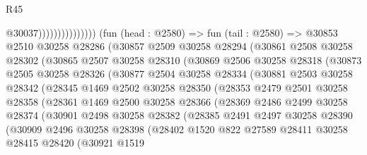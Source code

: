 \begin{lexlean}{R45}
\begin{coremodule}
                                      @30037)))))))))))))))
        (fun (head : @2580) =>
        fun (tail : @2580) =>
        @30853
          @2510
          @30258
          @28286
          (@30857
            @2509
            @30258
            @28294
            (@30861
              @2508
              @30258
              @28302
              (@30865
                @2507
                @30258
                @28310
                (@30869
                  @2506
                  @30258
                  @28318
                  (@30873
                    @2505
                    @30258
                    @28326
                    (@30877
                      @2504
                      @30258
                      @28334
                      (@30881
                        @2503
                        @30258
                        @28342
                        (@28345
                          @1469
                          @2502
                          @30258
                          @28350
                          (@28353
                            @2479
                            @2501
                            @30258
                            @28358
                            (@28361
                              @1469
                              @2500
                              @30258
                              @28366
                              (@28369
                                @2486
                                @2499
                                @30258
                                @28374
                                (@30901
                                  @2498
                                  @30258
                                  @28382
                                  (@28385
                                    @2491
                                    @2497
                                    @30258
                                    @28390
                                    (@30909
                                      @2496
                                      @30258
                                      @28398
                                      (@28402
                                        @1520
                                        @822
                                        @27589
                                        @28411
                                        @30258
                                        @28415
                                        @28420
                                        (@30921
                                          @1519

\end{coremodule}
\end{lexlean}
